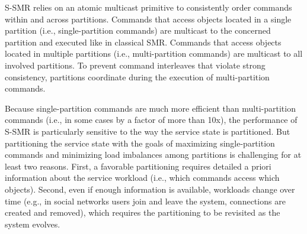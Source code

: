 %
%
S-SMR relies on an atomic multicast primitive to consistently order commands within and across partitions. 
Commands that access objects located in a single partition (i.e., single-partition commands) are multicast to the concerned partition and executed like in classical SMR. 
Commands that access objects located in multiple partitions (i.e., multi-partition commands) are multicast to all involved partitions.
To prevent command interleaves that violate strong consistency, partitions coordinate during the execution of multi-partition commands.

Because single-partition commands are much more efficient than multi-partition commands (i.e., in some cases by a factor of more than 10x), the performance of S-SMR is particularly sensitive to the way the service state is partitioned.
But partitioning the service state with the goals of maximizing single-partition commands and minimizing load imbalances among partitions is challenging for at least two reasons.
First, a favorable partitioning requires detailed a priori information about the service workload (i.e., which commands access which objects).
Second, even if enough information is available, workloads change over time (e.g., in social networks users join and leave the system, connections are created and removed), which requires the partitioning to be revisited as the system evolves.

